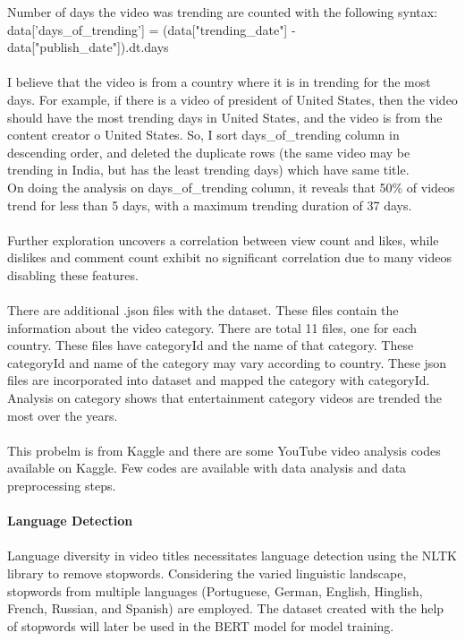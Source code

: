 \documentclass[12pt]{article}
\begin{document}
{{Number of days the video was trending are counted with the following syntax:\\ data['days\_of\_trending'] = (data["trending\_date"] - data["publish\_date"]).dt.days}\\ \\
{I believe that the video is from a country where it is in trending for the most days. For example, if there is a video of president of United States, then the video should have the most trending days in United States, and the video is from the content creator o United States. So, I sort days\_of\_trending column in descending order, and deleted the duplicate rows (the same video may be trending in India, but has the least trending days) which have same title.}\\
{On doing the analysis on days\_of\_trending column, it reveals that 50\% of videos trend for less than 5 days, with a maximum trending duration of 37 days.}\\ \\
{Further exploration uncovers a correlation between view count and likes, while dislikes and comment count exhibit no significant correlation due to many videos disabling these features.}\\ \\
{There are additional .json files with the dataset. These files contain the information about the video category. There are total 11 files, one for each country. These files have categoryId and the name of that category. These categoryId and name of the category may vary according to country. These json files are incorporated into dataset and mapped the category with categoryId. Analysis on category shows that entertainment category videos are trended the most over the years.}\\ \\
{This probelm is from Kaggle and there are some YouTube video analysis codes available on Kaggle. Few codes are available with data analysis and data preprocessing steps.}\\ \\
{\bf  Language Detection}\\ \\
{Language diversity in video titles necessitates language detection using the NLTK library to remove stopwords. Considering the varied linguistic landscape, stopwords from multiple languages (Portuguese, German, English, Hinglish, French, Russian, and Spanish) are employed. The dataset created with the help of stopwords will later be used in the BERT model for model training.}\\ \\
}
\end{document}
